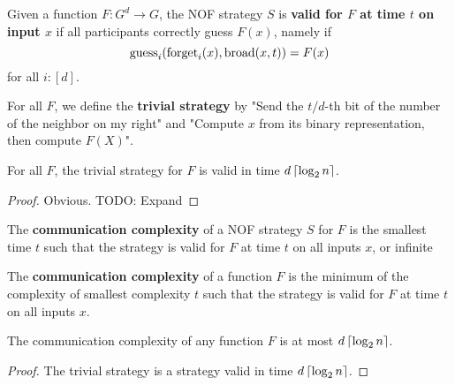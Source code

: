 \begin{definition}
  \label{def:valid-strategy}

  Given a function $F : G^d \to G$, the NOF strategy $S$ is {\bf valid for $F$ at time $t$ on input $x$} if all participants correctly guess $F(x)$, namely if
  $$\operatorname{guess}_i(\operatorname{forget}_i(x), \operatorname{broad}(x, t)) = F(x)$$
  for all $i : [d]$.
\end{definition}

\begin{definition}
  \label{def:trivial-strategy}

  For all $F$, we define the {\bf trivial strategy} by "Send the $t / d$-th bit of the number of the neighbor on my right" and "Compute $x$ from its binary representation, then compute $F(X)$".
\end{definition}

\begin{lemma}
  \label{lem:trivial-strategy-valid}

  For all $F$, the trivial strategy for $F$ is valid in time $d\left\lceil \log_2 n\right\rceil$.
\end{lemma}
\begin{proof}

  Obvious. TODO: Expand
\end{proof}

\begin{definition}
  \label{def:strategy-complexity}

  The {\bf communication complexity} of a NOF strategy $S$ for $F$ is the smallest time $t$ such that the strategy is valid for $F$ at time $t$ on all inputs $x$, or infinite
\end{definition}

\begin{definition}
  \label{def:function-complexity}

  The {\bf communication complexity} of a function $F$ is the minimum of the complexity of smallest complexity $t$ such that the strategy is valid for $F$ at time $t$ on all inputs $x$.
\end{definition}

\begin{lemma}
  \label{lem:trivial-bound-function-complexity}

  The communication complexity of any function $F$ is at most $d\left\lceil \log_2 n\right\rceil$.
\end{lemma}
\begin{proof}

  The trivial strategy is a strategy valid in time $d\left\lceil \log_2 n\right\rceil$.
\end{proof}

